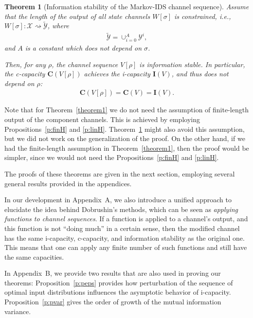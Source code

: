 \documentclass[journal, twocol]{IEEEtran}
\newcommand{\bfC}{{\mathbf{C}}}
\newcommand{\bfI}{{\mathbf{I}}}
\newcommand{\mX}{{\mathcal{X}}}
\newcommand{\mY}{{\mathcal{Y}}}
\newcommand{\tmY}{{\widetilde{\mY}}}
\newcommand{\tosq}{\rightsquigarrow}
\newtheorem{theorem}{Theorem}
\begin{document}
\begin{theorem}[Information stability of the Markov-IDS channel sequence]
\label{t:cviv}
Assume that the length of the output of all state channels $W[\sigma]$ is constrained, i.e., $W[\sigma]:\mX\tosq \tmY$, where 
\vspace*{-0.2cm}
\begin{align}
\tmY=\cup_{i=0}^A \mY^i,
\label{eq:tmY}
\end{align}
and $A$ is a constant which does not depend on $\sigma$.

Then, for any $\rho$, the channel sequence $V[\rho]$ is information stable.
In particular, the c-capacity $\bfC(V[\rho])$ achieves the i-capacity $\bfI(V)$, and thus does not depend on $\rho$:
\begin{align}
\bfC(V[\rho])=\bfC(V)=\bfI(V).
\label{eq:vnisis}
\end{align}
\end{theorem}

Note that for Theorem~\ref{theorem1}  we do not need the assumption of finite-length output of the component channels. 
This is achieved by employing Propositions~\ref{p:finH} and \ref{p:linH}.
Theorem~\ref{t:cviv} might also avoid this assumption, but we did not work on the generalization of the proof.
On the other hand, if we had the finite-length assumption in Theorem~\ref{theorem1}, then the proof would be simpler, since we would not need the Propositions~\ref{p:finH} and \ref{p:linH}.

The proofs of these theorems are given in the next section, employing several general results provided in the appendices.

In our development in Appendix~A, we also introduce a unified approach to elucidate the idea behind Dobrushin's methods, which can be seen as \emph{applying functions to channel sequences}. If a function is applied to a channel's output, and this function is not ``doing much'' in a certain sense, then the modified channel has the same i-capacity, c-capacity, and information stability as the original one. This 
means that one can apply any finite number of such functions and still have the same capacities.

In Appendix~B, we provide two results that are also used in proving our theorems: Proposition~\ref{p:peps} provides how perturbation of the sequence of optimal input distributions influences the asymptotic behavior of i-capacity.
Proposition~\ref{p:pvar} gives the order of growth of the mutual information variance.
\end{document}
